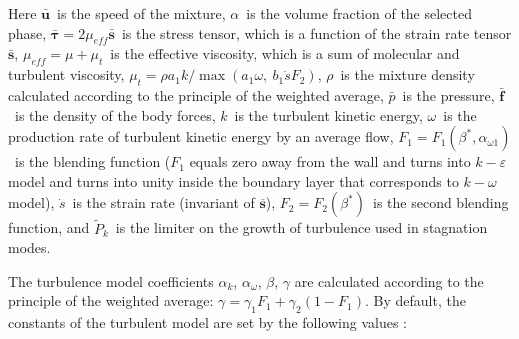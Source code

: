 \documentclass[sensors,article,submit,moreauthors,pdftex]{Definitions/mdpi}
\begin{document}
Here $\bar{\boldsymbol{u}}$~is the speed of the mixture, $\alpha$~is the volume fraction of the selected phase, $\bar{\boldsymbol{\tau}} = 2 \mu_{eff} \bar{\boldsymbol{s}}$~is the stress tensor, which is a function of the strain rate tensor $\bar{\boldsymbol{s}}$, $\mu_{eff} = \mu + \mu_t$~is the effective viscosity, which is a sum of molecular and turbulent viscosity, $\mu_t = \rho a_1 k / \max(a_1 \omega, \ b_1 \dot{s} F_2)$, $\rho$~is the mixture density calculated according to the principle of the weighted average, $\bar{p}$~is the pressure, $\bar{\boldsymbol{f}}$~is the density of the body forces, $k$~is the turbulent kinetic energy, $\omega$~is the production rate of turbulent kinetic energy by an average flow, $F_1 = F_1(\beta^*, \alpha_{\omega 1})$~is the blending function ($F_1$ equals zero away from the wall and turns into $k-\varepsilon$ model and turns into unity inside the boundary layer that corresponds to $k-\omega$ model), $\dot{s}$~is the strain rate (invariant of $\overline{\boldsymbol{s}}$), $F_2 = F_2(\beta^*)$~is the second blending function, and $\widetilde{P}_k$~is the limiter on the growth of turbulence used in stagnation modes.

The turbulence model coefficients $\alpha_k$, $\alpha_\omega$, $\beta$, $\gamma$ are calculated according to the principle of the weighted average: $\gamma = \gamma_1 F_1 + \gamma_2 (1 - F_1)$. By default, the constants of the turbulent model are set by the following values \cite{LaunderSpalding1974, Tahry1983, LaunderMorseRodiSpaldiug1972}:
\end{document}
